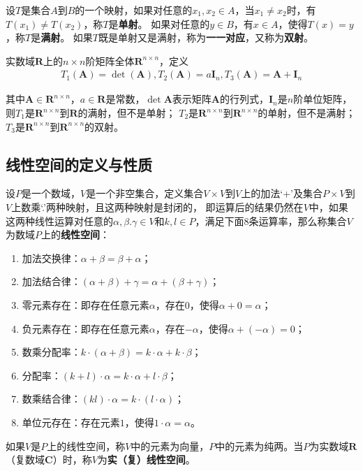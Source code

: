 \begin{definition}
    设$T$是集合$A$到$B$的一个映射，如果对任意的$x_{1},x_{2}\in{A}$，当$x_{1}\neq{x_{2}}$时，有$T(x_{1})\neq{T(x_{2})}$，称$T$是\textbf{单射}。
    如果对任意的$y\in{B}$，有$x\in{A}$，使得$T(x)=y$，称$T$是\textbf{满射}。
    如果$T$既是单射又是满射，称为\textbf{一一对应}，又称为\textbf{双射}。
\end{definition}

\begin{example}
    实数域$\mathbf{R}$上的$n\times{n}$阶矩阵全体$\mathbf{R}^{n\times{n}}$，定义
    \begin{eqnarray}
        T_{1}\left(\mathbf{A}\right)=\det\left(\mathbf{A}\right),T_{2}\left(\mathbf{A}\right)=a\mathbf{I}_{n},T_{3}\left(\mathbf{A}\right)=\mathbf{A}+\mathbf{I}_{n}\nonumber
    \end{eqnarray}
\end{example}
其中$\mathbf{A}\in\mathbf{R}^{n\times{n}}$，$a\in\mathbf{R}$是常数，$\det\mathbf{A}$表示矩阵$\mathbf{A}$的行列式，$\mathbf{I}_{n}$是$n$阶单位矩阵，则$T_{1}$是$\mathbf{R}^{n\times{n}}$到$\mathbf{R}$的满射，但不是单射；
$T_{2}$是$\mathbf{R}^{n\times{n}}$到$\mathbf{R}^{n\times{n}}$的单射，但不是满射；
$T_{3}$是$\mathbf{R}^{n\times{n}}$到$\mathbf{R}^{n\times{n}}$的双射。
\subsection{线性空间的定义与性质}
\begin{definition}
    设$P$是一个数域，$V$是一个非空集合，定义集合$V\times{V}$到$V$上的加法‘+’及集合$P\times{V}$到$V$上数乘‘.’两种映射，且这两种映射是封闭的，
    即运算后的结果仍然在$V$中，如果这两种线性运算对任意的$\alpha,\beta.\gamma\in{V}$和$k,l\in{P}$，满足下面8条运算率，那么称集合$V$为数域$P$上的\textbf{线性空间}：
    \begin{enumerate}[label=(\arabic*)]
        \item 加法交换律：$\alpha+\beta=\beta+\alpha$；
        \item 加法结合律：$(\alpha+\beta)+\gamma=\alpha+(\beta+\gamma)$；
        \item 零元素存在：即存在任意元素$\alpha$，存在$0$，使得$\alpha+0=\alpha$；
        \item 负元素存在：即存在任意元素$\alpha$，存在$-\alpha$，使得$\alpha+(-\alpha)=0$；
        \item 数乘分配率：$k\cdot\left(\alpha+\beta\right)=k\cdot\alpha+k\cdot\beta$；
        \item 分配率：$(k+l)\cdot\alpha=k\cdot\alpha+l\cdot\beta$；
        \item 数乘结合律：$\left(kl\right)\cdot\alpha=k\cdot\left(l\cdot\alpha\right)$；
        \item 单位元存在：存在元素$1$，使得$1\cdot\alpha=\alpha$。
    \end{enumerate}

    如果$V$是$P$上的线性空间，称$V$中的元素为向量，$P$中的元素为纯两。当$P$为实数域$\mathbf{R}$（复数域$\mathbf{C}$）时，称$V$为\textbf{实（复）线性空间}。
\end{definition}

